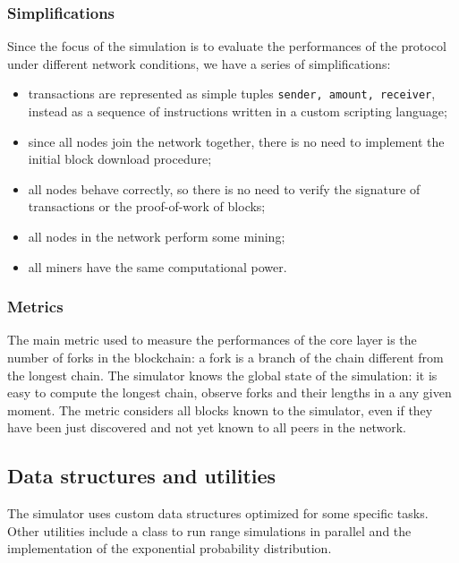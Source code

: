 \subsubsection{Simplifications}
Since the focus of the simulation is to evaluate the performances of the protocol under different network conditions, we have a series of simplifications:
\begin{itemize}
	\item transactions are represented as simple tuples \texttt{\textlangle sender, amount, receiver\textrangle}, instead as a sequence of instructions written in a custom scripting language;
	\item since all nodes join the network together, there is no need to implement the initial block download procedure;
	\item all nodes behave correctly, so there is no need to verify the signature of transactions or the proof-of-work of blocks;
	\item all nodes in the network perform some mining;
	\item all miners have the same computational power.
\end{itemize}

\subsubsection{Metrics}
The main metric used to measure the performances of the core layer is the number of forks in the blockchain:
a fork is a branch of the chain different from the longest chain.
The simulator knows the global state of the simulation:
it is easy to compute the longest chain, observe forks and their lengths in a any given moment.
The metric considers all blocks known to the simulator, even if they have been just discovered and not yet known to all peers in the network.

\subsection{Data structures and utilities}
The simulator uses custom data structures optimized for some specific tasks.
Other utilities include a class to run range simulations in parallel and the implementation of the exponential probability distribution.

